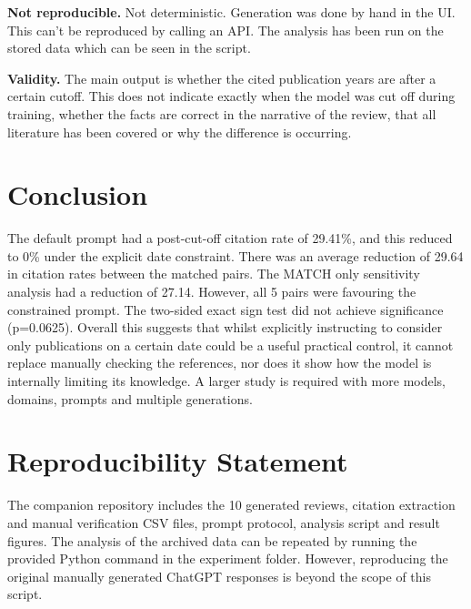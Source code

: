 \documentclass[manuscript]{acmart}
\begin{document}
\textbf{ Not reproducible. } Not deterministic. Generation was done by hand in the UI. This can't be reproduced by calling an API. The analysis has been run on the stored data which can be seen in the script.

\textbf{ Validity. } The main output is whether the cited publication years are after a certain cutoff. This does not indicate exactly when the model was cut off during training, whether the facts are correct in the narrative of the review, that all literature has been covered or why the difference is occurring.

\section{Conclusion}
The default prompt had a post-cut-off citation rate of 29.41\%, and this reduced to 0\% under the explicit date constraint. There was an average reduction of 29.64 in citation rates between the matched pairs. The MATCH only sensitivity analysis had a reduction of 27.14. However, all 5 pairs were favouring the constrained prompt. The two-sided exact sign test did not achieve significance (p=0.0625). Overall this suggests that whilst explicitly instructing to consider only publications on a certain date could be a useful practical control, it cannot replace manually checking the references, nor does it show how the model is internally limiting its knowledge. A larger study is required with more models, domains, prompts and multiple generations.

\section*{Reproducibility Statement}
The companion repository includes the 10 generated reviews, citation extraction and manual verification CSV files, prompt protocol, analysis script and result figures. The analysis of the archived data can be repeated by running the provided Python command in the experiment folder. However, reproducing the original manually generated ChatGPT responses is beyond the scope of this script.



\end{document}
